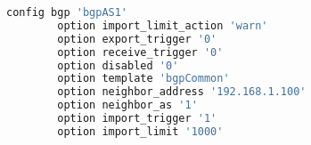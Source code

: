 \begin{lstlisting}[language=bash,caption={Tied options using UCI (II)}]
config bgp 'bgpAS1'
        option import_limit_action 'warn'
        option export_trigger '0'
        option receive_trigger '0'
        option disabled '0'
        option template 'bgpCommon'
        option neighbor_address '192.168.1.100'
        option neighbor_as '1'
        option import_trigger '1'
        option import_limit '1000'
\end{lstlisting}